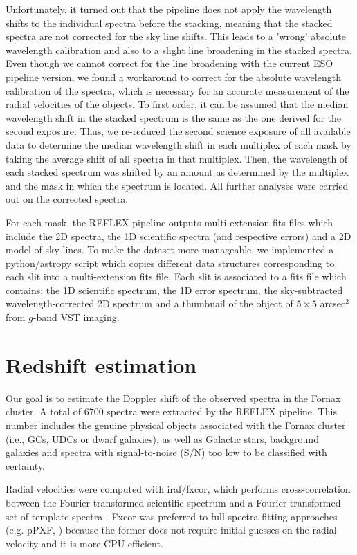 \documentclass[useAMS,usenatbib]{mn2e}
\begin{document}
Unfortunately, it turned out that the pipeline does not apply the wavelength 
shifts to the individual spectra before the stacking, meaning that the stacked
spectra are not corrected for the sky line shifts. This leads to a 'wrong'
absolute wavelength calibration and also to a slight line broadening in the 
stacked spectra. Even though we cannot correct for the line broadening with
the current ESO pipeline version, we found a workaround to correct for the
absolute wavelength calibration of the spectra, which is necessary for an 
accurate measurement of the radial velocities of the objects. To first order, 
it can be assumed that the median wavelength shift in the stacked spectrum is 
the same as the one derived for the second exposure. Thus, we re-reduced the 
second science exposure of all available data to determine the median 
wavelength shift in each multiplex of each mask by taking the average shift 
of all spectra in that multiplex. Then, the wavelength of each stacked 
spectrum was shifted by an amount as determined by the multiplex and the mask
in which the spectrum is located. All further analyses were carried out 
on the corrected spectra.

For each mask, the REFLEX pipeline outputs multi-extension fits files which include the 2D spectra, the 1D scientific spectra (and respective errors) and a 2D model of sky lines. To make the dataset more manageable, we implemented a python/astropy script which copies different data structures corresponding to each slit into a multi-extension fits file. Each slit is associated to a fits file which contains: the 1D scientific spectrum, the 1D error spectrum, the sky-subtracted wavelength-corrected 2D spectrum and a thumbnail of the object of $5\times5$ arcsec$^2$ from $g$-band VST imaging. 

\section{Redshift estimation}
\label{sec:zest}

Our goal is to estimate the Doppler shift of the observed spectra in the Fornax cluster. A total of 6700 spectra were extracted by the REFLEX pipeline. This number includes the genuine physical objects associated with the Fornax cluster (i.e., GCs, UDCs or dwarf galaxies), as well as Galactic stars, background galaxies and spectra with signal-to-noise (S$/$N) too low to be classified with certainty. 

Radial velocities were computed with iraf/fxcor, which performs cross-correlation between the Fourier-transformed scientific spectrum and a Fourier-transformed set of template spectra \citep{Tonry79}. Fxcor was preferred to full spectra fitting approaches (e.g. pPXF, \citealt{Cappellari04}) because the former does not require initial guesses on the radial velocity and it is more CPU efficient. 
\end{document}
